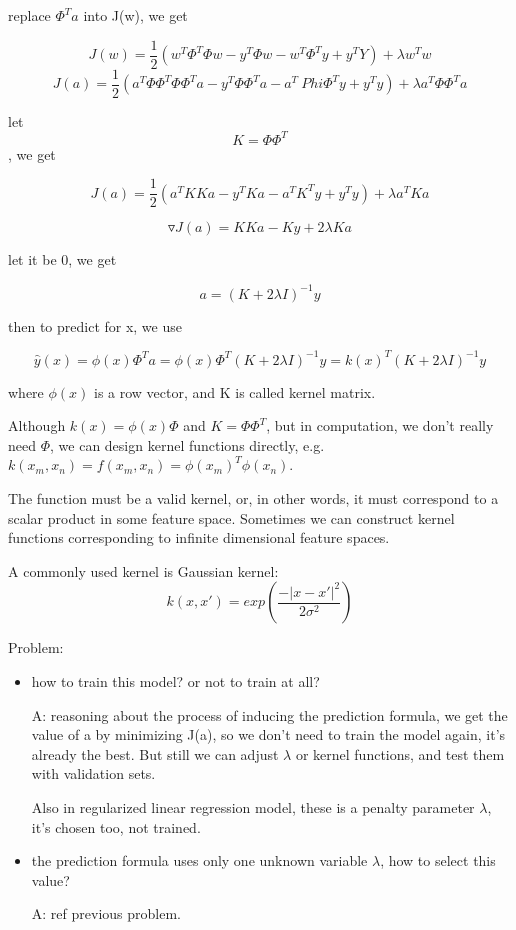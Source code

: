 \documentclass[10pt,a4paper]{book}
\begin{document}
replace $\Phi^T a$ into J(w), we get

$$J(w) = \frac 1 2 (w^T\Phi^T\Phi w -y^T\Phi w -w^T\Phi^Ty +y^TY) + \lambda w^Tw$$
$$J(a) = \frac 1 2 (a^T\Phi\Phi^T\Phi \Phi^T a -y^T\Phi \Phi^T a -a^T \ Phi \Phi^Ty +y^Ty) + \lambda a^T\Phi \Phi^T a$$

let $$K= \Phi \Phi^T$$, we get

$$J(a) = \frac 1 2 (a^T K K a -y^T K a -a^T K^Ty +y^Ty) + \lambda a^T K a$$

$$\triangledown J(a) = KKa - K y +2 \lambda K a $$

let it be 0, we get

$$a = (K + 2\lambda I)^{-1}y$$

then to predict for x, we use

$$\hat y(x) = \phi(x) \Phi^T a = \phi(x) \Phi^T (K + 2 \lambda I)^{-1}y = k(x)^T (K + 2 \lambda I)^{-1}y$$

where $\phi(x)$ is a row vector, and K is called kernel matrix.


Although $k(x) = \phi(x) \Phi$ and $K = \Phi \Phi^T$, but in computation, we don't really need $\Phi$, we can design kernel functions directly, e.g. $k(x_m,x_n) = f(x_m, x_n) = \phi(x_m)^T \phi(x_n)$. 

The function must be a valid kernel, or, in other words, it must correspond to a scalar product in some feature space. Sometimes we can construct kernel functions corresponding to infinite dimensional feature spaces.

A commonly used kernel is Gaussian kernel:
 $$ k(x,x') = exp(\frac {- \vert x - x' \vert ^2} {2 \sigma ^2})$$

Problem: 
\begin{itemize}

	\item  how to train this model? or not to train at all? 

	A: reasoning about the process of inducing the prediction formula, we get the value of a by minimizing J(a), so we don't need to train the model again, it's already the best. But still we can adjust $\lambda$ or kernel functions, and test them with validation sets.

	Also in regularized linear regression model, these is a penalty parameter $\lambda$, it's chosen too, not trained.

	\item the prediction formula uses only one unknown variable $\lambda$, how to select this value?

	A: ref previous problem.

\end{itemize}
\end{document}

